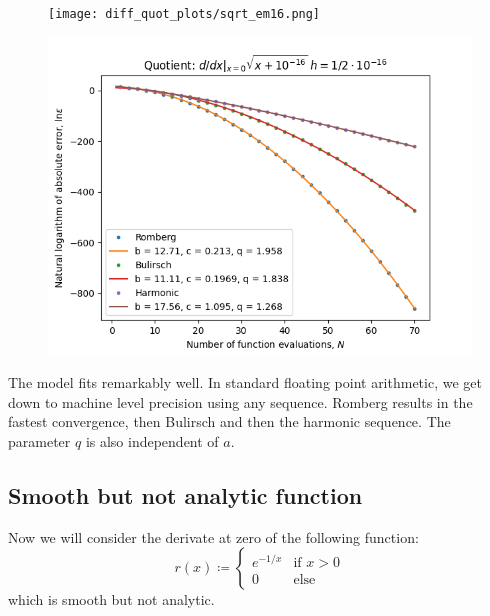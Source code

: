 \begin{figure}[H]
\centering
\begin{minipage}{0.45\textwidth}
\centering
\texttt{[image: diff\_quot\_plots/sqrt\_em16.png]}
\end{minipage}
\begin{minipage}{0.45\textwidth}
\centering
\includegraphics[scale=0.45]{diff_quot_plots/sqrt_em16_hp_trend.png}
\end{minipage}
\end{figure}


The model fits remarkably well. In standard floating point arithmetic, we get down to machine level precision using any sequence. Romberg results in the fastest convergence, then Bulirsch and then the harmonic sequence. The parameter \(q\) is also independent of \(a\).

\subsection{Smooth but not analytic function}

Now we will consider the derivate at zero of the following function:
\[
r(x) \coloneqq \begin{cases}
e^{-1/x} & \text{if } x > 0\\
0 & \text{else}
\end{cases}
\]
which is smooth but not analytic.

